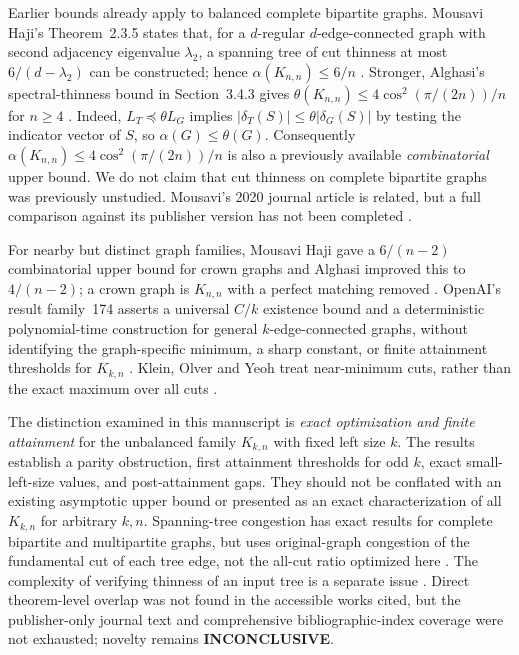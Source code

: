 \documentclass[11pt,a4paper]{article}
\newcommand{\al}{\alpha}
\newcommand{\del}{\delta}
\newcommand{\KK}[2]{K_{#1,#2}}
\begin{document}
Earlier bounds already apply to balanced complete bipartite graphs. Mousavi Haji's Theorem~2.3.5 states that, for a $d$-regular $d$-edge-connected graph with second adjacency eigenvalue $\lambda_2$, a spanning tree of cut thinness at most $6/(d-\lambda_2)$ can be constructed; hence $\al(\KK{n}{n})\le 6/n$ \cite{mousavithesis}. Stronger, Alghasi's spectral-thinness bound in Section~3.4.3 gives $\theta(\KK{n}{n})\le 4\cos^2(\pi/(2n))/n$ for $n\ge4$ \cite{alghasi}. Indeed, $L_T\preceq\theta L_G$ implies $|\del_T(S)|\le\theta|\del_G(S)|$ by testing the indicator vector of $S$, so $\al(G)\le\theta(G)$. Consequently $\al(\KK{n}{n})\le4\cos^2(\pi/(2n))/n$ is also a previously available \emph{combinatorial} upper bound. We do not claim that cut thinness on complete bipartite graphs was previously unstudied. Mousavi's 2020 journal article is related, but a full comparison against its publisher version has not been completed \cite{mousavijournal}.

For nearby but distinct graph families, Mousavi Haji gave a $6/(n-2)$ combinatorial upper bound for crown graphs and Alghasi improved this to $4/(n-2)$; a crown graph is $\KK{n}{n}$ with a perfect matching removed \cite{mousavithesis,alghasi}. OpenAI's result family~174 asserts a universal $C/k$ existence bound and a deterministic polynomial-time construction for general $k$-edge-connected graphs, without identifying the graph-specific minimum, a sharp constant, or finite attainment thresholds for $\KK{k}{n}$ \cite{openaithin}. Klein, Olver and Yeoh treat near-minimum cuts, rather than the exact maximum over all cuts \cite{kleinolveryeoh}.

The distinction examined in this manuscript is \emph{exact optimization and finite attainment} for the unbalanced family $\KK{k}{n}$ with fixed left size $k$. The results establish a parity obstruction, first attainment thresholds for odd $k$, exact small-left-size values, and post-attainment gaps. They should not be conflated with an existing asymptotic upper bound or presented as an exact characterization of all $\KK{k}{n}$ for arbitrary $k,n$. Spanning-tree congestion has exact results for complete bipartite and multipartite graphs, but uses original-graph congestion of the fundamental cut of each tree edge, not the all-cut ratio optimized here \cite{hruska,kozawa}. The complexity of verifying thinness of an input tree is a separate issue \cite{moayyedi}. Direct theorem-level overlap was not found in the accessible works cited, but the publisher-only journal text and comprehensive bibliographic-index coverage were not exhausted; novelty remains \textbf{INCONCLUSIVE}.
\end{document}
